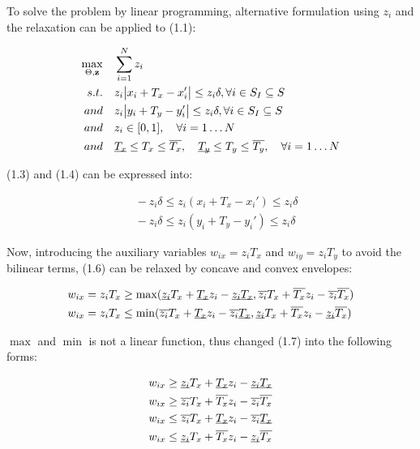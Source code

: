 \documentclass[paper=a4, fontsize=11pt]{scrartcl} %
\numberwithin{equation}{section} %
\numberwithin{figure}{section} %
\numberwithin{table}{section} %
\renewcommand{\vec}[1]{\mathbf{#1}}
\begin{document}
To solve the problem by linear programming, alternative formulation using $z_{i}$ and the relaxation can be applied to (1.1):

\begin{align}
\max_{\Theta, \vec{z}} &\quad \sum_{i=1}^{N} z_{i} \\
s.t. 	&\quad z_{i}\abs{x_{i} + T_{x} - x_{i}'} \leq z_{i} \delta, \forall i \in S_{I} \subseteq S \\
	and &\quad z_{i}\abs{y_{i} + T_{y} - y_{i}'} \leq z_{i} \delta, \forall i \in S_{I} \subseteq S \\
	and &\quad z_{i} \in [0, 1], \quad \forall i = 1 \dots N \\
	and &\quad \underbar{$T_{x}$} \leq T_{x} \leq \overline{T_{x}},
	\quad \underbar{$T_{y}$} \leq T_{y} \leq \overline{T_{y}}, \quad \forall i = 1 \dots N 
\end{align}

(1.3) and (1.4) can be expressed into:

\begin{equation}
\begin{split}
\quad - z_{i} \delta \leq z_{i} (x_{i} + T_{x} - x_{i}') \leq z_{i} \delta \\
\quad - z_{i} \delta \leq z_{i} (y_{i} + T_{y} - y_{i}') \leq z_{i} \delta 
\end{split}
\end{equation}

Now, introducing the auxiliary variables $w_{ix} = z_{i}T_{x}$ and $w_{iy} = z_{i}T_{y}$ to avoid the bilinear terms, (1.6) can be relaxed by concave and convex envelopes:

\begin{equation}
\begin{split}
w_{ix} = z_{i} T_{x} &\geq \max(\underbar{$z_{i}$} T_{x} + \underbar{$T_{x}$}z_{i} - \underbar{$z_{i}$}\underbar{$T_{x}$},
 	\overline{z_{i}} T_{x} + \overline{T_{x}}z_{i} - \overline{z_{i}} \overline{T_{x}}) \\
w_{ix} = z_{i} T_{x} &\leq \min(\overline{z_{i}}T_{x} + \underbar{$T_{x}$}z_{i} - \overline{z_{i}} \underbar{$T_{x}$}, 
	 \underbar{$z_{i}$} T_{x} + \overline{T_{x}}z_{i} - \underbar{$z_{i}$} \overline{T_{x}})
\end{split}
\end{equation}

$\max$ and $\min$ is not a linear function, thus changed (1.7) into the following forms:

\begin{equation}
\begin{split}
w_{ix} &\geq \underbar{$z_{i}$} T_{x} + \underbar{$T_{x}$}z_{i} - \underbar{$z_{i}$}\underbar{$T_{x}$} \\
w_{ix} &\geq \overline{z_{i}} T_{x} + \overline{T_{x}}z_{i} - \overline{z_{i}} \overline{T_{x}} \\
w_{ix} &\leq \overline{z_{i}}T_{x} + \underbar{$T_{x}$}z_{i} - \overline{z_{i}} \underbar{$T_{x}$} \\
w_{ix} &\leq \underbar{$z_{i}$} T_{x} + \overline{T_{x}}z_{i} - \underbar{$z_{i}$} \overline{T_{x}}
\end{split}
\end{equation}
\end{document}
